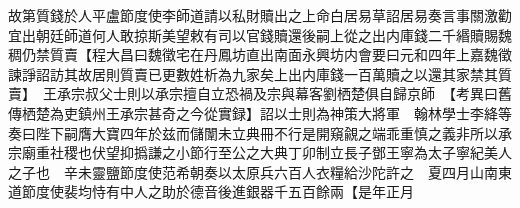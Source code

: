 故第質錢於人平盧節度使李師道請以私財贖出之上命白居易草詔居易奏言事關激勸宜出朝廷師道何人敢掠斯美望敕有司以官錢贖還後嗣上從之出内庫錢二千緡贖賜魏稠仍禁質賣【程大昌曰魏徵宅在丹鳳坊直出南面永興坊内會要曰元和四年上嘉魏徵諫諍詔訪其故居則質賣已更數姓析為九家矣上出内庫錢一百萬贖之以還其家禁其質賣】　王承宗叔父士則以承宗擅自立恐禍及宗與幕客劉栖楚俱自歸京師　【考異曰舊傳栖楚為吏鎮州王承宗甚奇之今從實録】詔以士則為神策大將軍　翰林學士李絳等奏曰陛下嗣膺大寶四年於兹而儲闈未立典冊不行是開窺覦之端乖重慎之義非所以承宗廟重社稷也伏望抑撝謙之小節行至公之大典丁卯制立長子鄧王寧為太子寧紀美人之子也　辛未靈鹽節度使范希朝奏以太原兵六百人衣糧給沙陀許之　夏四月山南東道節度使裴均恃有中人之助於德音後進銀器千五百餘兩【是年正月